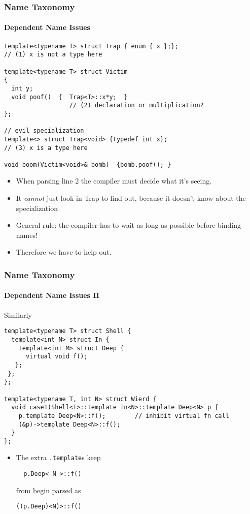 \begin{frame}[fragile,t]
\frametitle{Name Taxonomy}
\framesubtitle{Dependent Name Issues}
{\scriptsize
\begin{verbatim}
template<typename T> struct Trap { enum { x };};
// (1) x is not a type here

template<typename T> struct Victim
{
  int y;
  void poof()  {  Trap<T>::x*y;  }  
                  // (2) declaration or multiplication?
};

// evil specialization
template<> struct Trap<void> {typedef int x};
// (3) x is a type here

void boom(Victim<void>& bomb)  {bomb.poof(); }
\end{verbatim}
}


\begin{itemize}[<+->]
\item When parsing line 2 the compiler must decide what it's seeing.
\item It \emph{cannot} just look in Trap to find out, because it
  doesn't know about the specialization
\item General rule: the compiler has to wait as long as possible
  before binding names!
\item Therefore we have to help out.
\end{itemize}
\end{frame}

\begin{frame}[fragile,t]
\frametitle{Name Taxonomy}
\framesubtitle{Dependent Name Issues II}
Similarly
{\scriptsize
\begin{verbatim}
template<typename T> struct Shell {
  template<int N> struct In {
    template<int M> struct Deep {
      virtual void f();
   };
 };
};

template<typename T, int N> struct Wierd {
  void case1(Shell<T>::template In<N>::template Deep<N> p {
    p.template Deep<N>::f();        // inhibit virtual fn call
    (&p)->template Deep<N>::f();
  }
};
\end{verbatim}
}

\begin{itemize}[<+->]

\item The extra \texttt{.template}s keep 
{\scriptsize
\begin{verbatim}
  p.Deep< N >::f()
\end{verbatim}
}
from begin parsed as
{\scriptsize
\begin{verbatim}
((p.Deep)<N)>::f()
\end{verbatim}
}

\end{itemize}

\end{frame}

